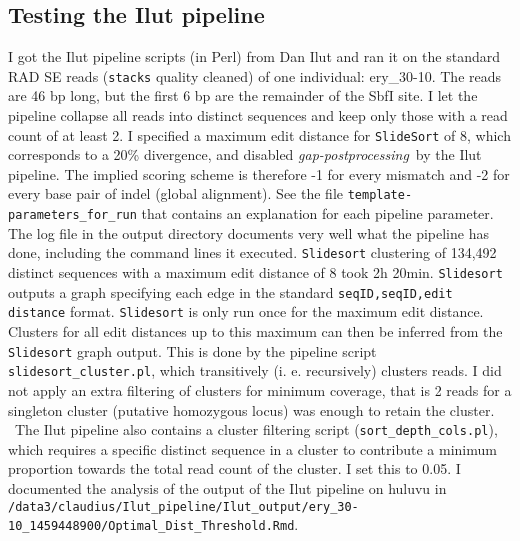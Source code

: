 \documentclass{article}\usepackage[]{graphicx}\usepackage[]{color}
\begin{document}


\subsection{Testing the Ilut pipeline}
I got the Ilut pipeline scripts (in Perl) from Dan Ilut and ran it on the standard RAD SE reads (\texttt{stacks} quality cleaned) of one individual: ery\_30-10. The reads are 46 bp long, but the first 6 bp are the remainder of the SbfI site. I let the pipeline collapse all reads into distinct sequences and keep only those with a read count of at least 2. I specified a maximum edit distance for \texttt{SlideSort} of 8, which corresponds to a 20\% divergence, and disabled \emph{gap-postprocessing}~by the Ilut pipeline. The implied scoring scheme is therefore -1 for every mismatch and -2 for every base pair of indel (global alignment). See the file \texttt{template-parameters\_for\_run} that contains an explanation for each pipeline parameter. The log file in the output directory documents very well what the pipeline has done, including the command lines it executed. \texttt{Slidesort} clustering of 134,492 distinct sequences with a maximum edit distance of 8 took 2h 20min. \texttt{Slidesort} outputs a graph specifying each edge in the standard \texttt{seqID,seqID,edit distance} format. \texttt{Slidesort} is only run once for the maximum edit distance. Clusters for all edit distances up to this maximum can then be inferred from the \texttt{Slidesort} graph output. This is done by the pipeline script \texttt{slidesort\_cluster.pl}, which transitively (i. e. recursively) clusters reads. I did not apply an extra filtering of clusters for minimum coverage, that is 2 reads for a singleton cluster (putative homozygous locus) was enough to retain the cluster.%
~The Ilut pipeline also contains a cluster filtering script (\texttt{sort\_depth\_cols.pl}), which requires a specific distinct sequence in a cluster to contribute a minimum proportion towards the total read count of the cluster. I set this to 0.05. I documented the analysis of the output of the Ilut pipeline on huluvu in \\ \texttt{/data3/claudius/Ilut\_pipeline/Ilut\_output/ery\_30-10\_1459448900/Optimal\_Dist\_Threshold.Rmd}.
\end{document}
